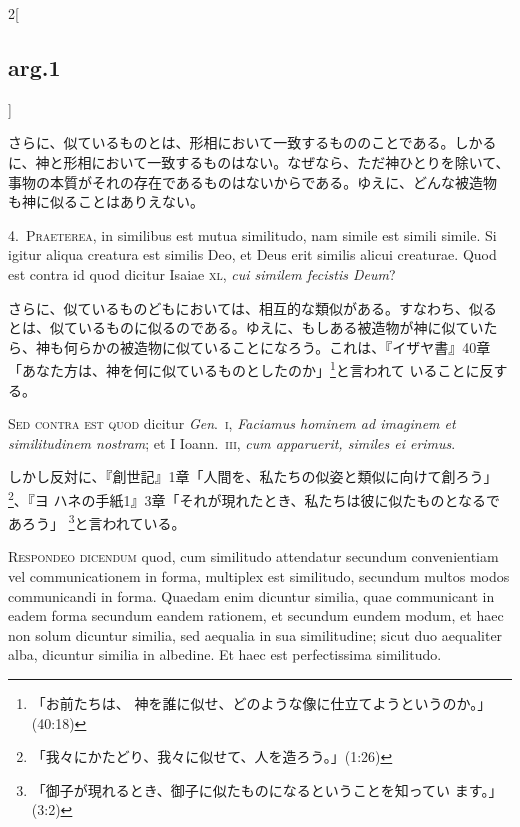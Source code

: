 \documentclass[paper=a4paper,fontsize=10pt,jafontsize=9pt,titlepage]{jlreq}
\begin{document}
\begin{paracol}{2}[\subsection{arg.1}]
\switchcolumn

さらに、似ているものとは、形相において一致するもののことである。しかる
に、神と形相において一致するものはない。なぜなら、ただ神ひとりを除いて、
事物の本質がそれの存在であるものはないからである。ゆえに、どんな被造物
も神に似ることはありえない。


4.~{\scshape Praeterea}, in similibus est mutua similitudo, nam simile
est simili simile. Si igitur aliqua creatura est similis Deo, et Deus
erit similis alicui creaturae. Quod est contra id quod dicitur Isaiae
{\scshape xl}, {\itshape cui similem fecistis Deum}?

\switchcolumn

さらに、似ているものどもにおいては、相互的な類似がある。すなわち、似る
とは、似ているものに似るのである。ゆえに、もしある被造物が神に似ていた
ら、神も何らかの被造物に似ていることになろう。これは、『イザヤ書』40章
「あなた方は、神を何に似ているものとしたのか」\footnote{「お前たちは、
神を誰に似せ、どのような像に仕立てようというのか。」(40:18)}と言われて
いることに反する。

\switchcolumn*[\subsection{s.c.}]

{\scshape Sed contra est quod} dicitur {\itshape Gen}.~{\scshape i},
{\itshape Faciamus hominem ad imaginem et similitudinem nostram}; et I
Ioann.~{\scshape iii}, {\itshape cum apparuerit, similes ei erimus}.

\switchcolumn

しかし反対に、『創世記』1章「人間を、私たちの似姿と類似に向けて創ろう」
\footnote{「我々にかたどり、我々に似せて、人を造ろう。」(1:26)}、『ヨ
ハネの手紙1』3章「それが現れたとき、私たちは彼に似たものとなるであろう」
\footnote{「御子が現れるとき、御子に似たものになるということを知ってい
ます。」(3:2)}と言われている。


{\scshape Respondeo dicendum} quod, cum similitudo attendatur secundum
 convenientiam vel communicationem in forma, multiplex est similitudo,
 secundum multos modos communicandi in forma. Quaedam enim dicuntur
 similia, quae communicant in eadem forma secundum eandem rationem, et
 secundum eundem modum, et haec non solum dicuntur similia, sed
 aequalia in sua similitudine; sicut duo aequaliter alba, dicuntur
 similia in albedine. Et haec est perfectissima similitudo.


\end{paracol}
\end{document}
